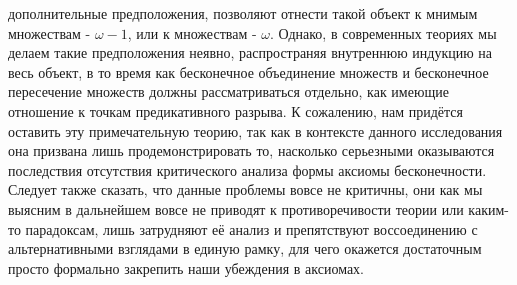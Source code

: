 \documentclass[12pt]{article}
\begin{document}
дополнительные предположения, позволяют отнести такой объект к мнимым множествам - $\omega - 1$, или к множествам - $\omega$. Однако, в современных теориях мы делаем такие предположения неявно, распространяя внутреннюю индукцию на весь объект, в то время как бесконечное объединение множеств и бесконечное пересечение множеств должны рассматриваться отдельно, как имеющие отношение к точкам предикативного разрыва. К сожалению, нам придётся оставить эту примечательную теорию, так как в контексте данного исследования она призвана лишь продемонстрировать то, насколько серьезными оказываются последствия отсутствия критического анализа формы аксиомы бесконечности. Следует также сказать, что данные проблемы вовсе не критичны, они как мы выясним в дальнейшем вовсе не приводят к противоречивости теории или каким-то парадоксам, лишь затрудняют её анализ и препятствуют воссоединению с альтернативными взглядами в единую рамку, для чего окажется достаточным просто формально закрепить наши убеждения в аксиомах. 
\end{document}
